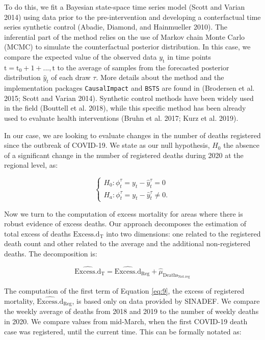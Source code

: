 \documentclass[
]{article}
\begin{document}
To do this, we fit a Bayesian state-space time series model (Scott and Varian 2014) using data prior to the pre-intervention and developing a conterfactual time series synthetic control (Abadie, Diamond, and Hainmueller 2010). The inferential part of the method relies on the use of Markov chain Monte Carlo (MCMC) to simulate the counterfactual posterior distribution. In this case, we compare the expected value of the observed data \(y_\text{t}\) in time points \(\text{t}=\text{t}_0+1+...,\text{t}\) to the average of samples from the forecasted posterior distribution \(\hat y_{t}\) of each draw \({\tau}\). More details about the method and the implementation packages \texttt{CausalImpact} and \texttt{BSTS} are found in (Brodersen et al. 2015; Scott and Varian 2014). Synthetic control methods have been widely used in the field (Bouttell et al. 2018), while this specific method has been already used to evaluate health interventions (Bruhn et al. 2017; Kurz et al. 2019).

In our case, we are looking to evaluate changes in the number of deaths registered since the outbreak of COVID-19. We state as our null hypothesis, \(H_0\) the absence of a significant change in the number of registered deaths during 2020 at the regional level, as:

\begin{equation}
  \label{eq:bayes}
   \begin{cases}
  H_0: \phi_{t}^{\tau}= y_{t} -  \hat y_{t}^{\tau} = 0 \\[1ex]
  H_a: \phi_{t}^{\tau}= y_{t} -  \hat y_{t}^{\tau} \neq 0.
   \end{cases}
\end{equation}

Now we turn to the computation of excess mortality for areas where there is robust evidence of excess deaths. Our approach decomposes the estimation of total excess of deaths \(\text{Excess.d}_\text{T}\) into two dimensions: one related to the registered death count and other related to the average and the additional non-registered deaths. The decomposition is:

\begin{equation}
  \label{eq:9}
  \widehat{\text{Excess.d}}_\text{T} = \widehat{\text{Excess.d}}_\text{Reg}+\widehat{\mu}_{\text{Deaths}_\text{Not.reg}}
\end{equation}

The computation of the first term of Equation \eqref{eq:9}, the excess of registered mortality, \(\widehat{\text{Excess.d}}_\text{Reg}\), is based only on data provided by SINADEF. We compare the weekly average of deaths from 2018 and 2019 to the number of weekly deaths in 2020. We compare values from mid-March, when the first COVID-19 death case was registered, until the current time. This can be formally notated as:
\end{document}
